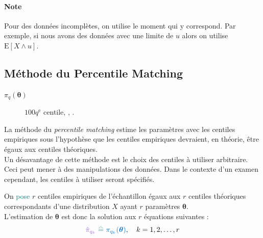 \documentclass[10pt, french]{article}
\begin{document}
\begin{multicols*}{2}
\paragraph{Note}	Pour des données incomplètes, on utilise le moment qui y correspond. Par exemple, si nous avons des données avec une limite de $u$ alors on utilise $\text{E}[X \wedge u]$.



\columnbreak
\subsection{Méthode du \guillemotleft Percentile Matching \guillemotright}
\begin{distributions}[Notation]
\begin{description}
	\item[$\pi_{q}(\bm{\theta})$]	$100q^{\text{e}}$ centile, , .
\end{description}
\end{distributions}

\begin{definitionNOHFILL}
\begin{rappel_enhanced}[Contexte]
La méthode du \og \textit{percentile matching} \fg{} estime les paramètres avec les centiles empiriques sous l'hypothèse que les centiles empiriques devraient, en théorie, être égaux aux centiles théoriques.\\

Un désavantage de cette méthode est le choix des centiles à utiliser arbitraire. Ceci peut mener à des manipulations des données. Dans le contexte d'un examen cependant, les centiles à utiliser seront spécifiés.
\end{rappel_enhanced}

On \textcolor{teal}{pose} $r$ \textcolor{amethyst}{centiles empiriques} de l'échantillon égaux aux $r$ \textcolor{trueblue}{centiles théoriques} correspondants d'une distribution $X$ ayant $r$ paramètres $\bm{\theta}$. \\

L'estimation de $\bm{\theta}$ est donc la solution aux $r$ équations suivantes : 
\begin{equation*}
	\textcolor{amethyst}{\hat{\pi}_{q_{k}}}\
	\textcolor{teal}{\equalhat}\	
	\textcolor{trueblue}{\pi_{q_{k}}(\bm{\theta})}, \quad	k = 1, 2, \dots, r
\end{equation*}
\end{definitionNOHFILL}



\end{multicols*}
\end{document}
